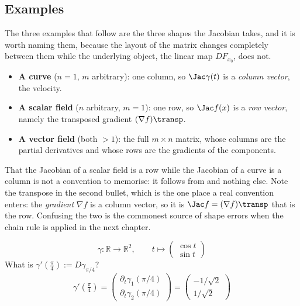\subsection{Examples}

The three examples that follow are the three shapes the Jacobian takes, and it is worth naming
them, because the layout of the matrix changes completely between them while the underlying
object, the linear map $DF_{x_0}$, does not.
\begin{itemize}
  \item \textbf{A curve} ($n=1$, $m$ arbitrary): one column, so $\Jac\gamma(t)$ is a
    \emph{column vector}, the velocity.
  \item \textbf{A scalar field} ($n$ arbitrary, $m=1$): one row, so $\Jac f(x)$ is a
    \emph{row vector}, namely the transposed gradient $(\nabla f)\transp$.
  \item \textbf{A vector field} (both $>1$): the full $m \times n$ matrix, whose columns are the
    partial derivatives and whose rows are the gradients of the components.
\end{itemize}
That the Jacobian of a scalar field is a row while the Jacobian of a curve is a column is not a
convention to memorise: it follows from  and nothing else. Note the
transpose in the second bullet, which is the one place a real convention enters: the
\emph{gradient} $\nabla f$ is a column vector, so it is $\Jac f = (\nabla f)\transp$ that is the
row. Confusing the two is the commonest source of shape errors when the chain rule is applied
in the next chapter.

\begin{example}
\[\gamma : \mathbb{R}\to\mathbb{R}^2, \qquad t \mapsto \begin{pmatrix}\cos t \\ \sin t\end{pmatrix}\]
What is $\gamma'(\tfrac{\pi}{4}) := D\gamma_{\pi/4}$?
\[\gamma'\!\left(\tfrac{\pi}{4}\right) = \begin{pmatrix}\partial_t\gamma_1(\pi/4) \\ \partial_t\gamma_2(\pi/4)\end{pmatrix} = \begin{pmatrix}-1/\sqrt{2} \\ 1/\sqrt{2}\end{pmatrix}\]
\end{example}

